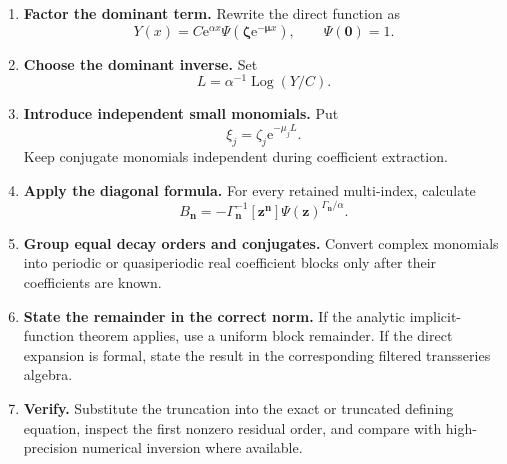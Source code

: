 \documentclass[11pt,oneside]{article}
\numberwithin{equation}{section}
\newcommand{\Log}{\operatorname{Log}}
\newcommand{\e}{\mathrm{e}}
\newcommand{\vct}[1]{\boldsymbol{#1}}
\newcommand{\coeff}[2]{[#1]#2}
\begin{document}
\begin{enumerate}
  \item \textbf{Factor the dominant term.}  Rewrite the direct function as
  \begin{equation}
    Y(x)=C\e^{\alpha x}\Psi(\vct\zeta\e^{-\vct\mu x}),
    \qquad \Psi(\vct0)=1.
  \end{equation}

  \item \textbf{Choose the dominant inverse.}  Set
  \begin{equation}
    L=\alpha^{-1}\Log(Y/C).
  \end{equation}

  \item \textbf{Introduce independent small monomials.}  Put
  \begin{equation}
    \xi_j=\zeta_j\e^{-\mu_jL}.
  \end{equation}
  Keep conjugate monomials independent during coefficient extraction.

  \item \textbf{Apply the diagonal formula.}  For every retained multi-index,
  calculate
  \begin{equation}
    B_{\vct n}=-\Gamma_{\vct n}^{-1}
    \coeff{\vct z^{\vct n}}
      {\Psi(\vct z)^{\Gamma_{\vct n}/\alpha}}.
  \end{equation}

  \item \textbf{Group equal decay orders and conjugates.}  Convert complex
  monomials into periodic or quasiperiodic real coefficient blocks only after
  their coefficients are known.

  \item \textbf{State the remainder in the correct norm.}  If the analytic
  implicit-function theorem applies, use a uniform block remainder.  If the
  direct expansion is formal, state the result in the corresponding filtered
  transseries algebra.

  \item \textbf{Verify.}  Substitute the truncation into the exact or truncated
  defining equation, inspect the first nonzero residual order, and compare with
  high-precision numerical inversion where available.
\end{enumerate}
\end{document}
